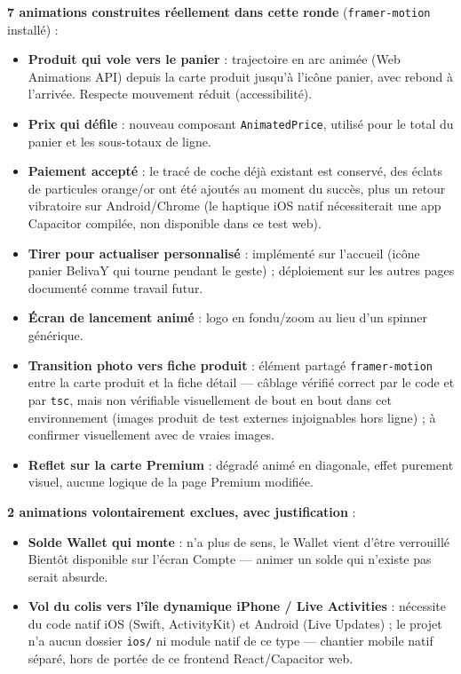 \documentclass[11pt]{article}
\begin{document}
\textbf{7 animations construites réellement dans cette ronde} (\texttt{framer-motion} installé) :
\begin{itemize}
  \item \textbf{Produit qui vole vers le panier} : trajectoire en arc animée (Web Animations API) depuis la carte produit jusqu'à l'icône panier, avec rebond à l'arrivée. Respecte \og mouvement réduit\fg{} (accessibilité).
  \item \textbf{Prix qui défile} : nouveau composant \texttt{AnimatedPrice}, utilisé pour le total du panier et les sous-totaux de ligne.
  \item \textbf{Paiement accepté} : le tracé de coche déjà existant est conservé, des éclats de particules orange/or ont été ajoutés au moment du succès, plus un retour vibratoire sur Android/Chrome (le haptique iOS natif nécessiterait une app Capacitor compilée, non disponible dans ce test web).
  \item \textbf{Tirer pour actualiser personnalisé} : implémenté sur l'accueil (icône panier BelivaY qui tourne pendant le geste) ; déploiement sur les autres pages documenté comme travail futur.
  \item \textbf{Écran de lancement animé} : logo en fondu/zoom au lieu d'un spinner générique.
  \item \textbf{Transition photo vers fiche produit} : élément partagé \texttt{framer-motion} entre la carte produit et la fiche détail — câblage vérifié correct par le code et par \texttt{tsc}, mais non vérifiable visuellement de bout en bout dans cet environnement (images produit de test externes injoignables hors ligne) ; à confirmer visuellement avec de vraies images.
  \item \textbf{Reflet sur la carte Premium} : dégradé animé en diagonale, effet purement visuel, aucune logique de la page Premium modifiée.
\end{itemize}

\textbf{2 animations volontairement exclues, avec justification} :
\begin{itemize}
  \item \textbf{Solde Wallet qui monte} : n'a plus de sens, le Wallet vient d'être verrouillé \og Bientôt disponible\fg{} sur l'écran Compte — animer un solde qui n'existe pas serait absurde.
  \item \textbf{Vol du colis vers l'île dynamique iPhone / Live Activities} : nécessite du code natif iOS (Swift, ActivityKit) et Android (Live Updates) ; le projet n'a aucun dossier \texttt{ios/} ni module natif de ce type — chantier mobile natif séparé, hors de portée de ce frontend React/Capacitor web.
\end{itemize}
\newpage
\end{document}
